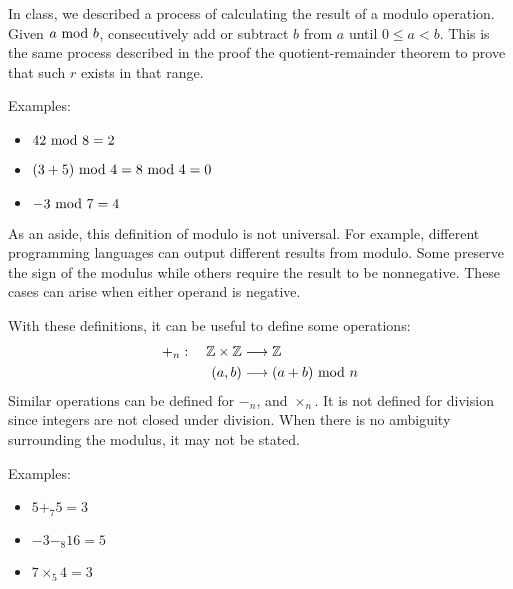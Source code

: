 In class, we described a process of calculating the result of a modulo operation. Given \(a\text{ mod } b\), consecutively add or subtract \(b\) from \(a\) until \(0\le a<b\).
This is the same process described in the proof the quotient-remainder theorem to prove that such \(r\) exists in that range.

Examples:
\begin{itemize}
    \item \(42 \text{ mod } 8=2\)
    \item \((3+5)\text{ mod } 4=8\text{ mod } 4=0\)
    \item \(-3\text{ mod } 7=4\)
\end{itemize}

As an aside, this definition of modulo is not universal. For example, different programming languages can output different results from modulo. Some preserve the sign of the modulus 
while others require the result to be nonnegative. These cases can arise when either operand is negative. 

With these definitions, it can be useful to define some operations:
\[\begin{aligned}
    +_n:\quad\mathbb{Z}\times\mathbb{Z}&\longrightarrow\mathbb{Z}\\
                                 (a,b) &\longrightarrow (a+b)\text{ mod } n
\end{aligned}\]
Similar operations can be defined for \(-_n\), and \(\times_n\). It is not defined for division since integers are not closed under division. When there is no ambiguity surrounding the modulus, 
it may not be stated.

Examples:
\begin{itemize}
    \item \(5+_7 5=3\)
    \item \(-3-_8 16=5\)
    \item \(7\times_5 4=3\)
\end{itemize}
